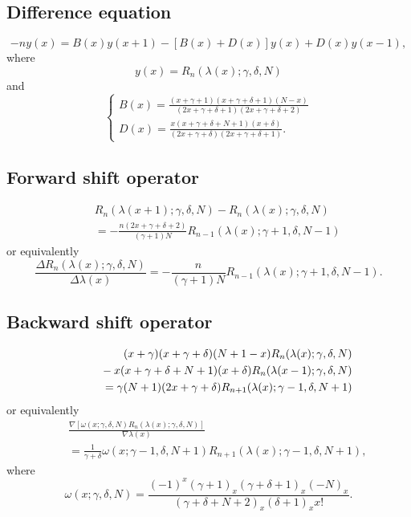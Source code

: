 \documentclass[envcountchap,graybox]{svmono}
\newcommand{\mathindent}{\hspace{7.5mm}}
\begin{document}
\subsection*{Difference equation}
\begin{equation}
\label{dvDualHahn}
-ny(x)=B(x)y(x+1)-\left[B(x)+D(x)\right]y(x)+D(x)y(x-1),
\end{equation}
where
$$y(x)=R_n(\lambda(x);\gamma,\delta,N)$$
and
$$\left\{\begin{array}{l}
\displaystyle B(x)=\frac{(x+\gamma+1)(x+\gamma+\delta+1)(N-x)}{(2x+\gamma+\delta+1)(2x+\gamma+\delta+2)}\\[5mm]
\displaystyle D(x)=\frac{x(x+\gamma+\delta+N+1)(x+\delta)}{(2x+\gamma+\delta)(2x+\gamma+\delta+1)}.
\end{array}\right.$$

\subsection*{Forward shift operator}
\begin{eqnarray}
\label{shift1DualHahnI}
& &R_n(\lambda(x+1);\gamma,\delta,N)-R_n(\lambda(x);\gamma,\delta,N)\nonumber\\
& &{}=-\frac{n(2x+\gamma+\delta+2)}{(\gamma+1)N}R_{n-1}(\lambda(x);\gamma+1,\delta,N-1)
\end{eqnarray}
or equivalently
\begin{equation}
\label{shift1DualHahnII}
\frac{\Delta R_n(\lambda(x);\gamma,\delta,N)}{\Delta\lambda(x)}=
-\frac{n}{(\gamma+1)N}R_{n-1}(\lambda(x);\gamma+1,\delta,N-1).
\end{equation}

\subsection*{Backward shift operator}
\begin{eqnarray}
\label{shift2DualHahnI}
& &(x+\gamma)(x+\gamma+\delta)(N+1-x)R_n(\lambda(x);\gamma,\delta,N)\nonumber\\
& &{}\mathindent{}-x(x+\gamma+\delta+N+1)(x+\delta)R_n(\lambda(x-1);\gamma,\delta,N)\nonumber\\
& &{}=\gamma(N+1)(2x+\gamma+\delta)R_{n+1}(\lambda(x);\gamma-1,\delta,N+1)
\end{eqnarray}
or equivalently
\begin{eqnarray}
\label{shift2DualHahnII}
& &\frac{\nabla\left[\omega(x;\gamma,\delta,N)R_n(\lambda(x);\gamma,\delta,N)\right]}{\nabla\lambda(x)}\nonumber\\
& &{}=\frac{1}{\gamma+\delta}\omega(x;\gamma-1,\delta,N+1)R_{n+1}(\lambda(x);\gamma-1,\delta,N+1),
\end{eqnarray}
where
$$\omega(x;\gamma,\delta,N)=\frac{(-1)^x(\gamma+1)_x(\gamma+\delta+1)_x(-N)_x}
{(\gamma+\delta+N+2)_x(\delta+1)_xx!}.$$
\end{document}
